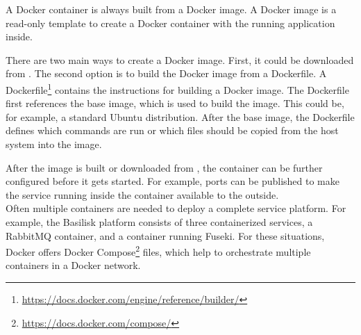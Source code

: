 A Docker container is always built from a Docker image.
A Docker image is a read-only template to create a Docker container with the running application inside.

There are two main ways to create a Docker image.
First, it could be downloaded from \dockh{}.
The second option is to build the Docker image from a Dockerfile.
A Dockerfile\footnote{\url{https://docs.docker.com/engine/reference/builder/}} contains the instructions for building a Docker image.
The Dockerfile first references the base image, which is used to build the image.
This could be, for example, a standard Ubuntu distribution.
After the base image, the Dockerfile defines which commands are run or which files should be copied from the host system into the image.

After the image is built or downloaded from \dockh{}, the container can be further configured before it gets started.
For example, ports can be published to make the service running inside the container available to the outside.
\\

Often multiple containers are needed to deploy a complete service platform.
For example, the Basilisk platform consists of three containerized services, a RabbitMQ container, and a container running Fuseki.
For these situations, Docker offers Docker Compose\footnote{\url{https://docs.docker.com/compose/}} files, which help to orchestrate multiple containers in a Docker network.



